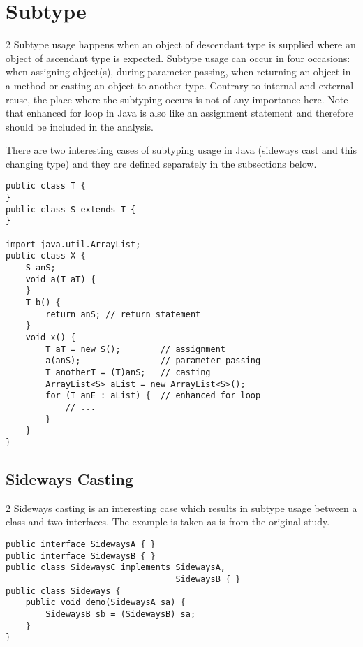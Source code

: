 \documentclass{uvamscse}
\begin{document}
\section{Subtype}
\begin{multicols} {2}
Subtype usage happens when an object of descendant type is supplied where an object of ascendant type is expected. Subtype usage can occur in four occasions: when assigning object(s), during parameter passing, when returning an object in a method or casting an object to another type. Contrary to internal and external reuse, the place where the subtyping occurs is not of any importance here. Note that enhanced for loop in Java is also like an assignment statement and therefore should be included in the analysis.

There are two interesting cases of subtyping usage in Java (sideways cast and this changing type) and they are defined separately in the subsections below.

\columnbreak
\begin{verbatim}
public class T {
}
public class S extends T {
}
    
import java.util.ArrayList;
public class X {
    S anS;
    void a(T aT) {
    }
    T b() {
        return anS; // return statement
    }
    void x() {
        T aT = new S();        // assignment
        a(anS);                // parameter passing
        T anotherT = (T)anS;   // casting
        ArrayList<S> aList = new ArrayList<S>();
        for (T anE : aList) {  // enhanced for loop
            // ...
        }
    }
}

\end{verbatim}
\end{multicols}

\subsection{Sideways Casting}
\begin{multicols} {2}
Sideways casting is an interesting case which results in subtype usage between a class and two interfaces. The example is taken as is from the original study.
\columnbreak
\begin{verbatim}
public interface SidewaysA { }
public interface SidewaysB { }
public class SidewaysC implements SidewaysA, 
                                  SidewaysB { }
public class Sideways {
    public void demo(SidewaysA sa) {
        SidewaysB sb = (SidewaysB) sa;
    }
}
\end{verbatim}
\end{multicols}
\end{document}
